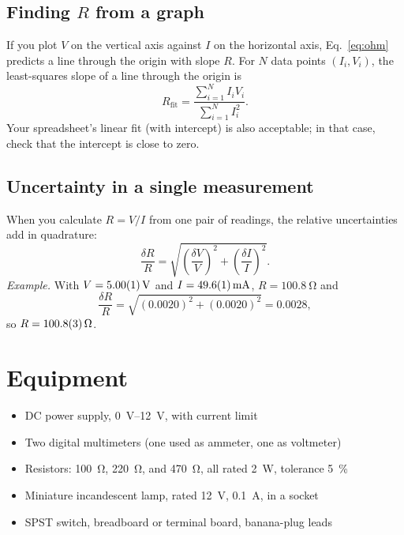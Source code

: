 \documentclass[11pt]{article}
\begin{document}
\subsection*{Finding $R$ from a graph}

If you plot $V$ on the vertical axis against $I$ on the horizontal axis, Eq.~\eqref{eq:ohm} predicts a line through the origin with slope $R$. For $N$ data points $(I_i, V_i)$, the least-squares slope of a line through the origin is
\begin{equation}
  R_\text{fit} = \frac{\sum_{i=1}^{N} I_i V_i}{\sum_{i=1}^{N} I_i^2}. \label{eq:fit}
\end{equation}
Your spreadsheet's linear fit (with intercept) is also acceptable; in that case, check that the intercept is close to zero.

\subsection*{Uncertainty in a single measurement}

When you calculate $R = V/I$ from one pair of readings, the relative uncertainties add in quadrature:
\begin{equation}
  \frac{\delta R}{R} = \sqrt{\left(\frac{\delta V}{V}\right)^2 + \left(\frac{\delta I}{I}\right)^2}. \label{eq:unc}
\end{equation}
\emph{Example.} With $V = \SI{5.00 \pm 0.01}{\volt}$ and $I = \SI{49.6 \pm 0.1}{\milli\ampere}$, $R = \SI{100.8}{\ohm}$ and
\[
  \frac{\delta R}{R} = \sqrt{(0.0020)^2 + (0.0020)^2} = 0.0028,
\]
so $R = \SI{100.8 \pm 0.3}{\ohm}$.

\section{Equipment}

\begin{itemize}
  \item DC power supply, \SIrange{0}{12}{\volt}, with current limit
  \item Two digital multimeters (one used as ammeter, one as voltmeter)
  \item Resistors: \SI{100}{\ohm}, \SI{220}{\ohm}, and \SI{470}{\ohm}, all rated \SI{2}{\watt}, tolerance \SI{5}{\percent}
  \item Miniature incandescent lamp, rated \SI{12}{\volt}, \SI{0.1}{\ampere}, in a socket
  \item SPST switch, breadboard or terminal board, banana-plug leads
\end{itemize}
\end{document}
